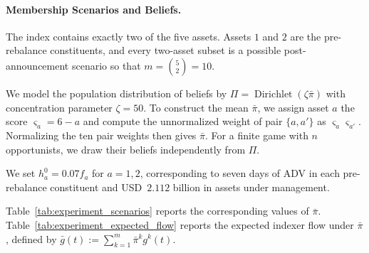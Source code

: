 \documentclass[12pt]{article}
\numberwithin{equation}{section}
\theoremstyle{definition}
\begin{document}
\paragraph{Membership Scenarios and Beliefs.}
The index contains exactly two of the five assets. Assets \(1\) and \(2\) are
the pre-rebalance constituents, and every two-asset subset is a possible
post-announcement scenario so that \(m=\binom{5}{2}=10\).

We model the population distribution of beliefs by
\(\Pi=\operatorname{Dirichlet}(\zeta\bar\pi)\) with
concentration parameter \(\zeta=50\). To construct the mean
\(\bar\pi\), we assign asset \(a\) the score \(\varsigma_a=6-a\) and compute
the unnormalized weight of pair \(\{a,a'\}\) as
\(\varsigma_a\varsigma_{a'}\). Normalizing the ten pair weights then gives
\(\bar\pi\). For a finite game with \(n\) opportunists, we draw their beliefs
independently from \(\Pi\).

We set \(h_a^0=0.07f_a\) for \(a=1,2\), corresponding to seven days of
ADV in each pre-rebalance constituent and USD~\(2.112\) billion in assets
under management.

Table~\ref{tab:experiment_scenarios} reports the
corresponding values of \(\bar\pi\). Table~\ref{tab:experiment_expected_flow}
reports the expected indexer flow under \(\bar\pi\), defined by
\(\bar g(t):=\sum_{k=1}^m\bar\pi^k g^k(t)\).
\end{document}
